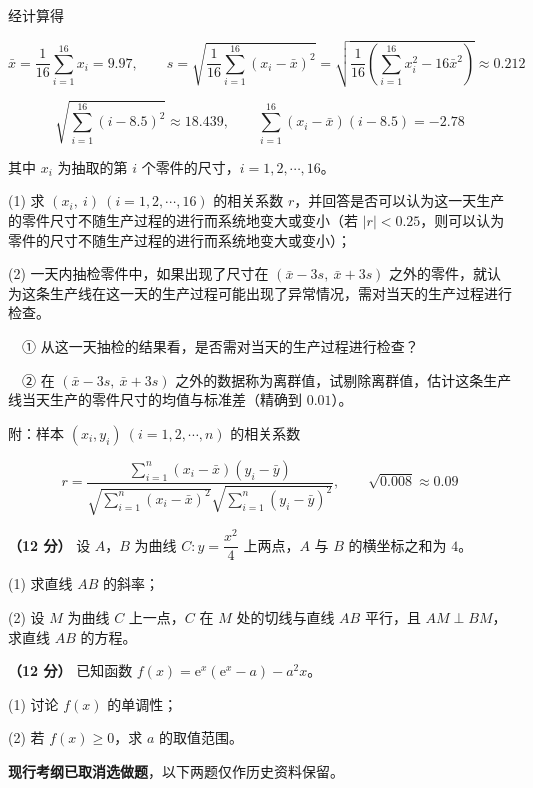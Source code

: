 经计算得

\[\bar x=\frac1{16}\sum_{i=1}^{16}x_i=9.97,\qquad s=\sqrt{\frac1{16}\sum_{i=1}^{16}\left(x_i-\bar x\right)^{2}}=\sqrt{\frac1{16}\left(\sum_{i=1}^{16}x_i^{2}-16\bar x^{2}\right)}\approx0.212\]

\[\sqrt{\sum_{i=1}^{16}(i-8.5)^{2}}\approx18.439,\qquad \sum_{i=1}^{16}\left(x_i-\bar x\right)(i-8.5)=-2.78\]

其中 $x_i$ 为抽取的第 $i$ 个零件的尺寸，$i=1,2,\cdots,16$。

  (1) 求 $\left(x_i,\ i\right)\ (i=1,2,\cdots,16)$ 的相关系数 $r$，并回答是否可以认为这一天生产的零件尺寸不随生产过程的进行而系统地变大或变小（若 $|r|<0.25$，则可以认为零件的尺寸不随生产过程的进行而系统地变大或变小）；

  (2) 一天内抽检零件中，如果出现了尺寸在 $(\bar x-3s,\ \bar x+3s)$ 之外的零件，就认为这条生产线在这一天的生产过程可能出现了异常情况，需对当天的生产过程进行检查。

  　① 从这一天抽检的结果看，是否需对当天的生产过程进行检查？

  　② 在 $(\bar x-3s,\ \bar x+3s)$ 之外的数据称为离群值，试剔除离群值，估计这条生产线当天生产的零件尺寸的均值与标准差（精确到 $0.01$）。

  附：样本 $\left(x_i,y_i\right)\ (i=1,2,\cdots,n)$ 的相关系数

\[r=\frac{\sum\limits_{i=1}^{n}\left(x_i-\bar x\right)\left(y_i-\bar y\right)}{\sqrt{\sum\limits_{i=1}^{n}\left(x_i-\bar x\right)^{2}}\sqrt{\sum\limits_{i=1}^{n}\left(y_i-\bar y\right)^{2}}},\qquad \sqrt{0.008}\approx0.09\]

\textbf{（12 分）} 设 $A$，$B$ 为曲线 $C:y=\dfrac{x^{2}}4$ 上两点，$A$ 与 $B$ 的横坐标之和为 $4$。

  (1) 求直线 $AB$ 的斜率；

  (2) 设 $M$ 为曲线 $C$ 上一点，$C$ 在 $M$ 处的切线与直线 $AB$ 平行，且 $AM\perp BM$，求直线 $AB$ 的方程。

\textbf{（12 分）} 已知函数 $f(x)=\mathrm e^{x}\left(\mathrm e^{x}-a\right)-a^{2}x$。

  (1) 讨论 $f(x)$ 的单调性；

  (2) 若 $f(x)\ge0$，求 $a$ 的取值范围。

\par\medskip


\begin{gktip}
\textbf{ 现行考纲已取消选做题}，以下两题仅作历史资料保留。
\end{gktip}

